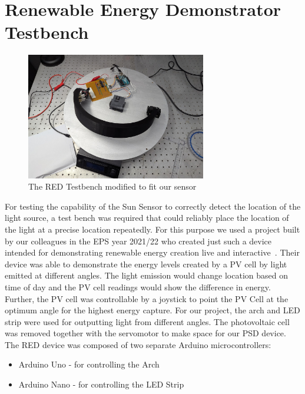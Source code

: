 \section{Renewable Energy Demonstrator Testbench}
\label{REDtestbench}

\begin{figure}[htbp]
    \centering
    \includegraphics[width=0.7\textwidth]{chapters/methodology/RED/RED_image.png}
    \caption{The RED Testbench modified to fit our sensor} 
    \label{fig:RED_testbench_flowchart}
\end{figure}

For testing the capability of the Sun Sensor to correctly detect the location of the light source, a test bench was required that could reliably place the location of the light at a precise location repeatedly. For this purpose we used a project built by our colleagues in the \acf{EPS} year 2021/22 who created just such a device intended for demonstrating renewable energy creation live and interactive~\cite{RefWorks:shopov2022renewable}. Their device was able to demonstrate the energy levels created by a \ac{PV} cell by light emitted at different angles. The light emission would change location based on time of day and the PV cell readings would show the difference in energy. Further, the PV cell was controllable by a joystick to point the PV Cell at the optimum angle for the highest energy capture. For our project, the arch and LED strip were used for outputting light from different angles. The photovoltaic cell was removed together with the servomotor to make space for our \ac{PSD} device.  The \ac{RED} device was composed of two separate Arduino microcontrollers:
\begin{itemize}
    \item Arduino Uno - for controlling the Arch 
    \item Arduino Nano - for controlling the LED Strip
\end{itemize}


